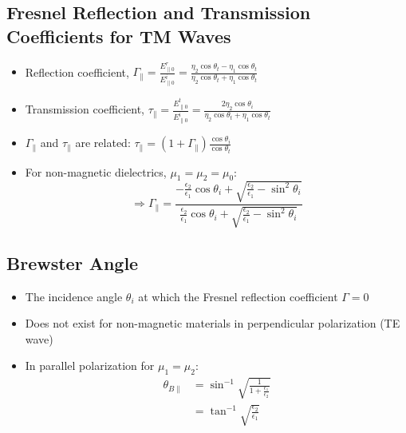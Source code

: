 \documentclass[a4paper]{article}
\begin{document}
\subsection{Fresnel Reflection and Transmission Coefficients for TM Waves}
\begin{itemize}
    \item Reflection coefficient, $\Gamma_\parallel = \displaystyle\frac{E^r_{\parallel 0}}{E^i_{\parallel 0}} = \displaystyle\frac{\eta_2\cos\theta_t-\eta_1\cos\theta_t}{\eta_2\cos\theta_t+\eta_1\cos\theta_t}$
    \item Transmission coefficient, $\tau_\parallel = \displaystyle\frac{E^t_{\parallel 0}}{E^i_{\parallel 0}} = \displaystyle\frac{2\eta_2\cos\theta_i}{\eta_2\cos\theta_t+\eta_1\cos\theta_t}$
    \item $\Gamma_\parallel$ and $\tau_\parallel$ are related: $\tau_\parallel = (1+\Gamma_\parallel)\displaystyle\frac{\cos\theta_i}{\cos\theta_t}$
    \item For non-magnetic dielectrics, $\mu_1 = \mu_2 = \mu_0$:
    $$\Rightarrow \Gamma_\parallel = \displaystyle\frac{-\displaystyle\frac{\epsilon_2}{\epsilon_1}\cos\theta_i+\sqrt{\displaystyle\frac{\epsilon_2}{\epsilon_1}-\sin^2\theta_i}}{\displaystyle\frac{\epsilon_2}{\epsilon_1}\cos\theta_i+\sqrt{\displaystyle\frac{\epsilon_2}{\epsilon_1}-\sin^2\theta_i}}$$
\end{itemize}

\subsection{Brewster Angle}
\begin{itemize}
    \item The incidence angle $\theta_i$ at which the Fresnel reflection coefficient $\Gamma = 0$
    \item Does not exist for non-magnetic materials in perpendicular polarization (TE wave)
    \item In parallel polarization for $\mu_1 = \mu_2$:
    \begin{align*}
        \theta_{B \parallel} &= \sin^{-1}\sqrt{\frac{1}{1+\displaystyle\frac{\epsilon_1}{\epsilon_2}}}\\
        &= \tan^{-1}\sqrt{\displaystyle\frac{\epsilon_2}{\epsilon_1}}
    \end{align*}
\end{itemize}
\end{document}
